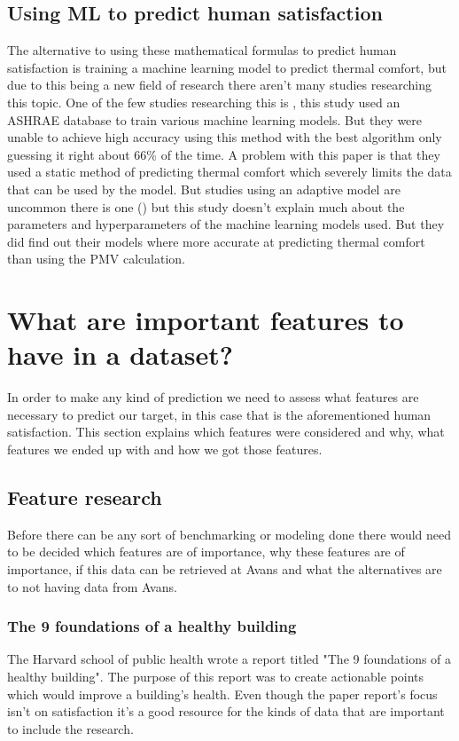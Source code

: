 \documentclass[12pt,a4paper]{article}
\begin{document}
\subsection{Using ML to predict human satisfaction}
The alternative to using these mathematical formulas to predict human satisfaction is training a machine learning model to predict thermal comfort, but due to this being a new field of research there aren't many studies researching this topic. One of the few studies researching this is \add{(}\cite{LUO2020109776}\add{)}, this study used an ASHRAE database to train various machine learning models. But they were unable to achieve high accuracy using this method with the best algorithm only guessing it right about 66\% of the time. A problem  with this paper is that they used a static method of predicting thermal comfort which severely limits the data that can be used by the model. But studies using an adaptive model are uncommon there is one (\cite{CHAI2020109937}) but this study doesn't explain much about the parameters and hyperparameters of the machine learning models used. But they did find out their models where more accurate at predicting thermal comfort than using the PMV calculation.
 
\section{What are important features to have in a dataset?}
In order to make any kind of prediction we need to assess what features are necessary to predict our target, in this case that is the aforementioned human satisfaction. This section explains which features were considered and why, what features we ended up with and how we got those features.
\subsection{Feature research}
Before there can be any sort of benchmarking or modeling done there would need to be decided which features are of importance, why these features are of importance, if this data can be retrieved at Avans and what the alternatives are to not having data from Avans.

\subsubsection{The 9 foundations of a healthy building}
The Harvard school of public health wrote a report titled "The 9 foundations of a healthy building". The purpose of this report was to create actionable points which would improve a building's health. Even though the paper report's focus isn't on satisfaction it's a good resource for the kinds of data that are important to include the research.
\end{document}
